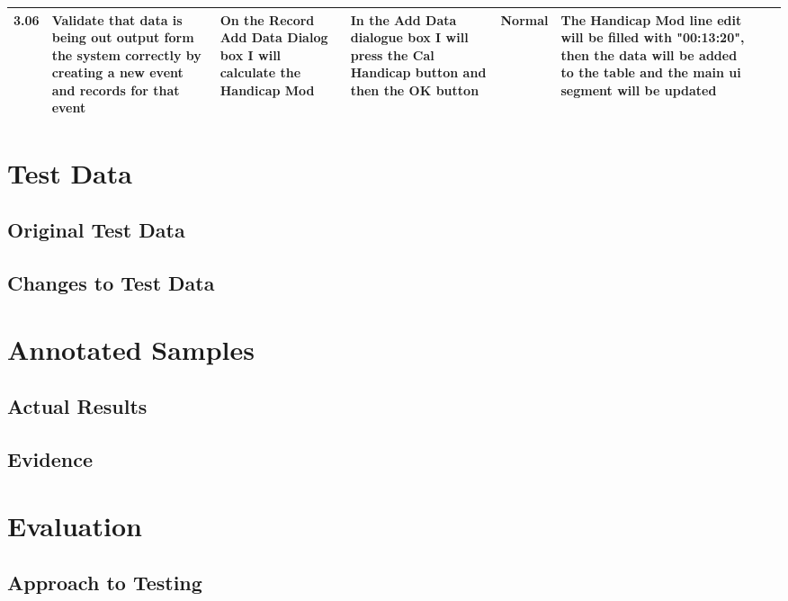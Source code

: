 \begin{landscape}
\begin{center}
\begin{longtable}{|p{1.5cm}|p{2.5cm}|p{2.5cm}|p{2cm}|p{2cm}|p{2cm}|p{2cm}|p{2cm}|}
        \rowcolor{LiteGray} 3.06 & Validate that data is being out output form the system correctly by creating a new event and records for that event & On the Record Add Data Dialog box I will calculate the Handicap Mod & In the Add Data dialogue box I will press the Cal Handicap button and then the OK button & Normal & The Handicap Mod line edit will be filled with "00:13:20", then  the data will be added to the table and the main ui segment will be updated & & \\ \hline
    \end{longtable}
    
\end{center}


\section{Test Data}

\subsection{Original Test Data}

\subsection{Changes to Test Data}

\section{Annotated Samples}

\subsection{Actual Results}

\subsection{Evidence}

\end{landscape}

\section{Evaluation}

\subsection{Approach to Testing}

